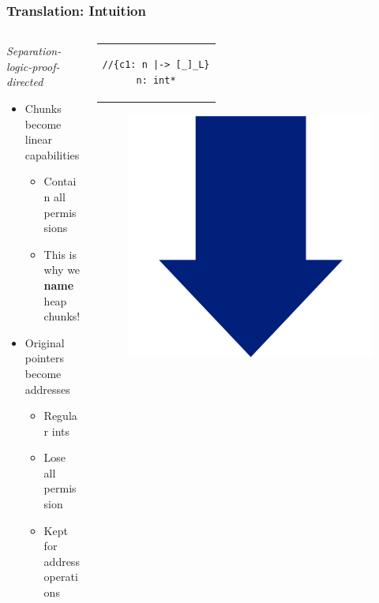 \documentclass{beamer}
\begin{document}
\begin{frame}[fragile]
\frametitle{Translation: Intuition}
\begin{columns}
\begin{column}{0.6\textwidth}
\emph{Separation-logic-proof-directed}
\begin{itemize}
\item Chunks become linear capabilities
	\begin{itemize}
	\item Contain all permissions
	\item This is why we \textbf{name} heap chunks!
	\end{itemize}
\item Original pointers become addresses
	\begin{itemize}
	\item Regular ints
	\item Lose all permission
	\item Kept for address operations
	\end{itemize} 
\end{itemize}
\end{column}
\begin{column}{0.4\textwidth}

\begin{center}
\begin{tabular}{c}
\begin{lstlisting}[style=CStyleNoNum, captionpos = t]
//{c1: n |-> [_]_L}
n: int*
\end{lstlisting}
\end{tabular}
\end{center}

\vspace{-.5em}
\begin{figure}[h]
\centering
\includegraphics[width=0.20\linewidth]{BlueArrowVertical}
\end{figure}
\vspace{-1em}


\end{column}
\end{columns}
\end{frame}
\end{document}
